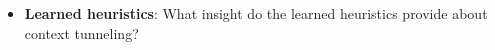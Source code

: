 \begin{itemize}
\item {\bf Learned heuristics}: What insight do the learned
  heuristics provide about context tunneling?

\end{itemize}





